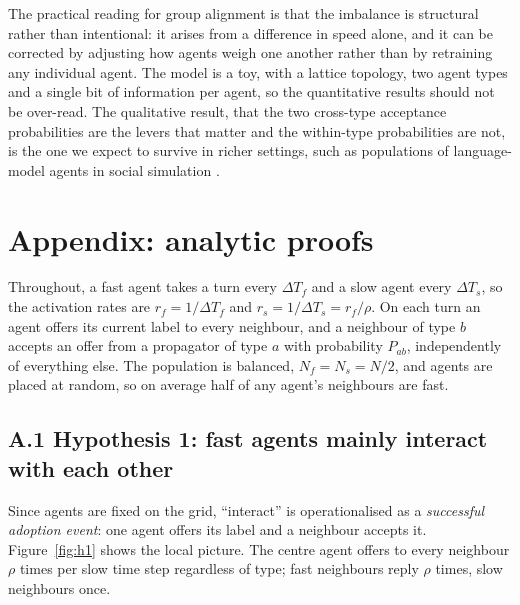 \documentclass{article}
\newcommand{\Pab}[2]{P_{#1#2}}      %
\newcommand{\dTf}{\Delta T_f}
\newcommand{\dTs}{\Delta T_s}
\begin{document}
The practical reading for group alignment is that the imbalance is structural rather than intentional: it arises from a difference in speed alone, and it can be corrected by adjusting how agents weigh one another rather than by retraining any individual agent. The model is a toy, with a lattice topology, two agent types and a single bit of information per agent, so the quantitative results should not be over-read. The qualitative result, that the two cross-type acceptance probabilities are the levers that matter and the within-type probabilities are not, is the one we expect to survive in richer settings, such as populations of language-model agents in social simulation \cite{park2023}.






\section{Appendix: analytic proofs}

Throughout, a fast agent takes a turn every $\dTf$ and a slow agent every $\dTs$, so the activation rates are $r_f = 1/\dTf$ and $r_s = 1/\dTs = r_f/\rho$. On each turn an agent offers its current label to every neighbour, and a neighbour of type $b$ accepts an offer from a propagator of type $a$ with probability $\Pab{a}{b}$, independently of everything else. The population is balanced, $N_f = N_s = N/2$, and agents are placed at random, so on average half of any agent's neighbours are fast.

\subsection*{A.1 \quad Hypothesis 1: fast agents mainly interact with each other}

Since agents are fixed on the grid, ``interact'' is operationalised as a \emph{successful adoption event}: one agent offers its label and a neighbour accepts it. Figure~\ref{fig:h1} shows the local picture. The centre agent offers to every neighbour $\rho$ times per slow time step regardless of type; fast neighbours reply $\rho$ times, slow neighbours once. \\
\end{document}
